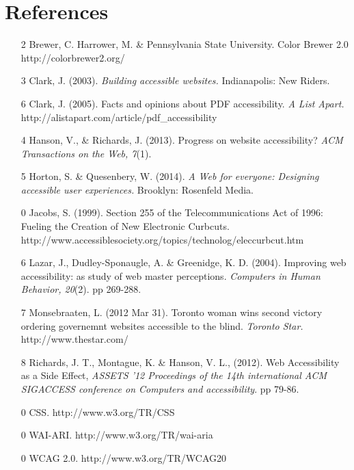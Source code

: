 \documentclass{acm_proc_article-sp}
\begin{document}
\section{References}
\begin{itemize}
\item[2] Brewer, C. Harrower, M. \& Pennsylvania State University. Color Brewer 2.0 http://colorbrewer2.org/
\item[3] Clark, J. (2003). {\it Building accessible websites.} Indianapolis: New Riders.
\item[6] Clark, J. (2005). Facts and opinions about PDF accessibility. {\it A List Apart.}\\http://alistapart.com/article/pdf\_accessibility
\item[4] Hanson, V., \& Richards, J. (2013). Progress on website accessibility? {\it ACM Transactions on the Web, 7}(1).
\item[5] Horton, S. \& Quesenbery, W. (2014). {\it A Web for everyone: Designing accessible user experiences.} Brooklyn: Rosenfeld Media.
\item[0] Jacobs, S. (1999). Section 255 of the Telecommunications Act of 1996: Fueling the Creation of New Electronic Curbcuts.\\http://www.accessiblesociety.org/topics/technolog/eleccurbcut.htm 
\item[6] Lazar, J., Dudley-Sponaugle, A. \& Greenidge, K. D. (2004). Improving web accessibility: as study of web master perceptions. {\it Computers in Human Behavior, 20}(2). pp 269-288.
\item[7] Monsebraaten, L. (2012 Mar 31). Toronto woman wins  second victory ordering governemnt websites accessible to the blind. {\it Toronto Star.} http://www.thestar.com/
\item[8] Richards, J. T., Montague, K. \& Hanson, V. L., (2012). Web Accessibility as a Side Effect, {\it ASSETS '12 Proceedings of the 14th international ACM SIGACCESS conference on Computers and accessibility}. pp 79-86.
\item[0] CSS. http://www.w3.org/TR/CSS
\item[0] WAI-ARI. http://www.w3.org/TR/wai-aria
\item[0] WCAG 2.0. http://www.w3.org/TR/WCAG20
\end{itemize}
%

%
%
\balancecolumns
\end{document}
